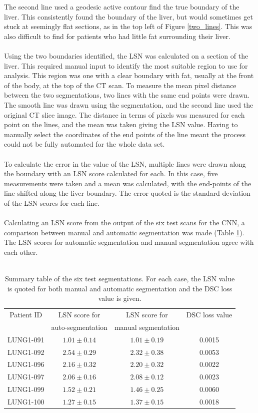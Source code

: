 \documentclass[12pt]{article}
\begin{document}
The second line used a geodesic active contour find the true boundary of the liver. This consistently found the boundary of the liver, but would sometimes get stuck at seemingly flat sections, as in the top left of Figure \ref{two_lines}. This was also difficult to find for patients who had little fat surrounding their liver. 
\\ \\
Using the two boundaries identified, the LSN was calculated on a section of the liver. This required manual input to identify the most suitable region to use for analysis. This region was one with a clear boundary with fat, usually at the front of the body, at the top of the CT scan. To measure the mean pixel distance between the two segmentations, two lines with the same end points were drawn. The smooth line was drawn using the segmentation, and the second line used the original CT slice image. The distance in terms of pixels was measured for each point on the lines, and the mean was taken giving the LSN value. Having to manually select the coordinates of the end points of the line meant the process could not be fully automated for the whole data set. 
\\ \\
To calculate the error in the value of the LSN, multiple lines were drawn along the boundary with an LSN score calculated for each. In this case, five measurements were taken and a mean was calculated, with the end-points of the line shifted along the liver boundary. The error quoted is the standard deviation of the LSN scores for each line.
\\ \\
Calculating an LSN score from the output of the six test scans for the CNN, a comparison between manual and automatic segmentation was made (Table \ref{tab:comparison}). The LSN scores for automatic segmentation and manual segmentation agree with each other. 
\\ \\
\begin{table}[h]
    \centering
    \caption {Summary table of the six test segmentations. For each case, the LSN value is quoted for both manual and automatic segmentation and the DSC loss value is given.}
    \label{tab:comparison}
    \begin{tabular}{c|c c c}
        Patient ID & LSN score for  & LSN score for & DSC loss value \\
        &auto-segmentation&manual segmentation\\
        \hline
        LUNG1-091 & $1.01\pm 0.14$ &$1.01\pm0.19$&0.0015\\
        LUNG1-092 & $2.54\pm 0.29$ &$2.32\pm0.38$& 0.0053\\
        LUNG1-096 & $2.16\pm0.32$ & $2.20\pm0.32$&0.0022\\
        LUNG1-097 & $2.06\pm0.16$ &$2.08\pm0.12 $&0.0023\\
        LUNG1-099 & $1.52\pm0.21$ &$1.46\pm0.25 $&0.0060\\
        LUNG1-100 & $1.27\pm 0.15$&$1.37\pm0.15$&0.0018
    \end{tabular}
\end{table}
\end{document}
